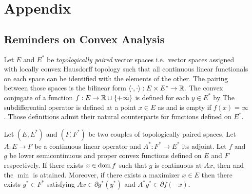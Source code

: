 \section{Appendix}

\subsection{Reminders on Convex Analysis}
\label{sec:ApxConvex}
Let $E$ and $E^*$ be \textit{topologically paired} vector spaces i.e.\ vector spaces assigned with locally convex Hausdorff topology such that all continuous linear functionals on each space can be identified with the elements of the other. The pairing between those spaces is the bilinear form $\langle \cdot , \cdot \rangle : E \times E^* \to \mathbb{R}$. The convex conjugate of a function $f:E\to \mathbb{R} \cup \{+\infty\}$ is defined for each $y\in E^*$ by
The subdifferential operator is defined at a point $x\in E$ as
and is empty if $f(x)=\infty$. Those definitions admit their natural counterparts for functions defined on $E^*$. %

\begin{theorem}
\label{thm_FR}
Let $(E,E^*)$ and $(F,F^*)$ be two couples of topologically paired spaces. Let $A : E \to F$ be a continuous linear operator and $A^*:F^* \to E^*$ its adjoint. Let $f$ and $g$ be lower semicontinuous and proper convex functions defined on $E$ and $F$ respectively. If there exists $x \in \operatorname{dom} f$ such that $g$ is continuous at $Ax$, then
and the $\min$ is attained. Moreover, if there exists a maximizer $x\in E$ then there exists $y^*\in F^*$ satisfying $Ax \in \partial g^*(y^*)$ and $A^*y^* \in \partial f(-x)$.
\end{theorem}
\iffalse
